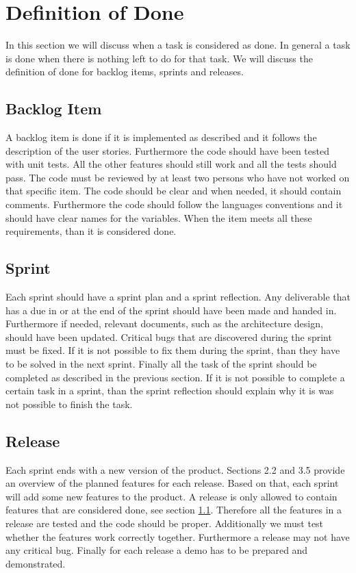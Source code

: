 \section{Definition of Done}
\label{sec: Definition-of-Done}
In this section we will discuss when a task is considered as done. In general a task is done when there is nothing left to do for that task. We will discuss the definition of done for backlog items, sprints and releases.

\subsection{Backlog Item}
\label{subsec: Done-Item}
A backlog item is done if it is implemented as described and it follows the description of the user stories. Furthermore the code should have been tested with unit tests. All the other features should still work and all the tests should pass. The code must be reviewed by at least two persons who have not worked on that specific item. The code should be clear and when needed, it should contain comments. Furthermore the code should follow the languages conventions and it should have clear names for the variables. When the item meets all these requirements, than it is considered done.

\subsection{Sprint}
Each sprint should have a sprint plan and a sprint reflection. Any deliverable that has a due in or at the end of the sprint should have been made and handed in. Furthermore  if needed, relevant documents, such as the architecture design, should have been updated. Critical bugs that are discovered during the sprint must be fixed. If it is not possible to fix them during the sprint, than they have to be solved in the next sprint. Finally all the task of the sprint should be completed as described in the previous section. If it is not possible to complete a certain task in a sprint, than the sprint reflection should explain why it is was not possible to finish the task.

\subsection{Release}
Each sprint ends with a new version of the product. Sections 2.2 and 3.5 provide an overview of the planned features for each release. Based on that, each sprint will add some new features to the product.
A release is only allowed to contain features that are considered done, see section \ref{subsec: Done-Item}. Therefore all the features in a release are tested and the code should be proper. Additionally we must test whether the features work correctly together. Furthermore a release may not have any critical bug. Finally for each release a demo has to be prepared and demonstrated. 